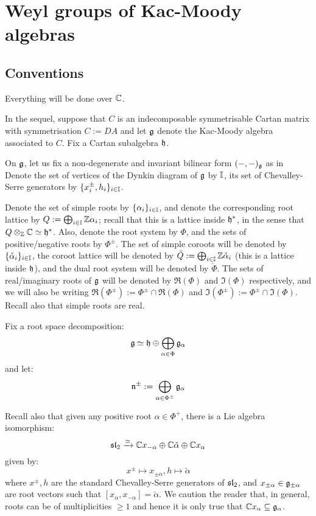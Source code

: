 \section{Weyl groups of Kac-Moody algebras}
    \subsection{Conventions}
        Everything will be done over $\bbC$.
    
        In the sequel, suppose that $C$ is an indecomposable symmetrisable Cartan matrix with symmetrisation $C := DA$ and let $\g$ denote the Kac-Moody algebra associated to $C$. Fix a Cartan subalgebra $\h$.
        
        On $\g$, let us fix a non-degenerate and invariant bilinear form $(-, -)_{\g}$ as in \cite[Chapter 2]{kac_infinite_dimensional_lie_algebras} Denote the set of vertices of the Dynkin diagram of $\g$ by $\simpleroots$, its set of Chevalley-Serre generators by $\{x_i^{\pm}, h_i\}_{i \in \simpleroots}$.
        
        Denote the set of simple roots by $\{\alpha_i\}_{i \in \simpleroots}$, and denote the corresponding root lattice by $Q := \bigoplus_{i \in \simpleroots} \Z \alpha_i$; recall that this is a lattice inside $\h^*$, in the sense that $Q \tensor_{\Z} \bbC \cong \h^*$. Also, denote the root system by $\Phi$, and the sets of positive/negative roots by $\Phi^{\pm}$. The set of simple coroots will be denoted by $\{\check{\alpha}_i\}_{i \in \simpleroots}$, the coroot lattice will be denoted by $\check{Q} := \bigoplus_{i \in \simpleroots} \Z\check{\alpha}_i$ (this is a lattice inside $\h$), and the dual root system will be denoted by $\check{\Phi}$. The sets of real/imaginary roots of $\g$ will be denoted by $\Re(\Phi)$ and $\Im(\Phi)$ respectively, and we will also be writing $\Re(\Phi^{\pm}) := \Phi^{\pm} \cap \Re(\Phi)$ and $\Im(\Phi^{\pm}) := \Phi^{\pm} \cap \Im(\Phi)$. Recall also that simple roots are real.

        Fix a root space decomposition:
            $$\g \cong \h \oplus \bigoplus_{\alpha \in \Phi} \g_{\alpha}$$
        and let:
            $$\n^{\pm} := \bigoplus_{\alpha \in \Phi^{\pm}} \g_{\alpha}$$
    
        Recall also that given any positive root $\alpha \in \Phi^+$, there is a Lie algebra isomorphism:
            $$\sl_2 \xrightarrow[]{\cong} \bbC x_{-\alpha} \oplus \bbC \check{\alpha} \oplus \bbC x_{\alpha}$$
        given by:
            $$x^{\pm} \mapsto x_{\pm \alpha}, h \mapsto \check{\alpha}$$
        where $x^{\pm}, h$ are the standard Chevalley-Serre generators of $\sl_2$, and $x_{\pm \alpha} \in \g_{\pm \alpha}$ are root vectors such that $[x_{\alpha}, x_{-\alpha}] = \check{\alpha}$. We caution the reader that, in general, roots can be of multiplicities $\geq 1$ and hence it is only true that $\bbC x_{\alpha} \subseteq \g_{\alpha}$.

